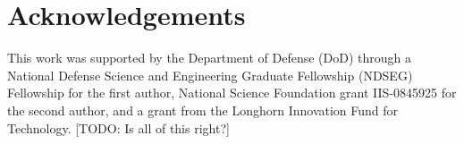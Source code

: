 


\section*{Acknowledgements}

This work was supported by the Department of Defense (DoD) through a
National Defense Science and Engineering Graduate Fellowship (NDSEG) Fellowship
for the first author, National Science Foundation grant IIS-0845925 for the
second author, and a grant from the Longhorn Innovation Fund for Technology.
[TODO: Is all of this right?]
